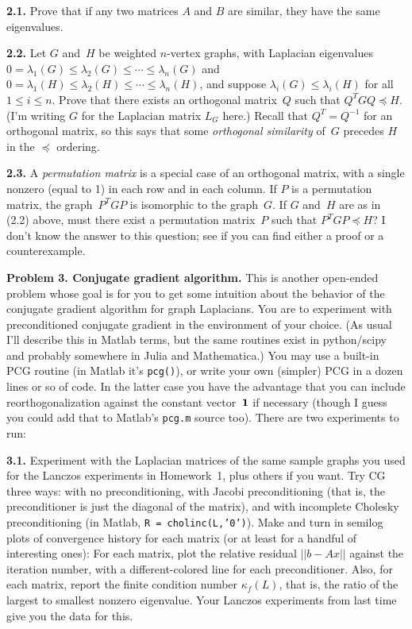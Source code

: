 \documentclass[11pt]{article}
\newcommand{\m}[1]{{\bf{#1}}}       %
\newcommand{\ones}{\m1}             %
\begin{document}
\par\medskip
{\bf 2.1.} 
Prove that if any two matrices $A$ and $B$ are similar, 
they have the same eigenvalues.

\par\medskip
{\bf 2.2.} 
Let $G$ and~$H$ be weighted $n$-vertex graphs, 
with Laplacian eigenvalues
$0=\lambda_1(G)\le\lambda_2(G)\le\cdots\le\lambda_n(G)$ and
$0=\lambda_1(H)\le\lambda_2(H)\le\cdots\le\lambda_n(H)$,
and suppose $\lambda_i(G)\le\lambda_i(H)$ for all $1\le i\le n$.
Prove that there exists an orthogonal matrix~$Q$ such that
$Q^TGQ \preceq H$. 
(I'm writing $G$ for the Laplacian matrix $L_G$ here.)
Recall that $Q^T=Q^{-1}$ for an orthogonal matrix,
so this says that some {\em orthogonal similarity} of~$G$
precedes $H$ in the $\preceq$ ordering.

\par\medskip
{\bf 2.3.} 
A {\em permutation matrix} is a special case of an orthogonal matrix, 
with a single nonzero (equal to 1) in each row and in each column.
If $P$ is a permutation matrix, 
the graph~$P^TGP$ is isomorphic to the graph~$G$.
If $G$ and~$H$ are as in (2.2) above, 
must there exist a permutation matrix~$P$ such that $P^TGP \preceq H$?
I don't know the answer to this question; 
see if you can find either a proof or a counterexample.

\par\bigskip
{\bf Problem 3. Conjugate gradient algorithm.}
This is another open-ended problem whose goal is for you to get some
intuition about the behavior of the conjugate gradient algorithm for graph 
Laplacians.
You are to experiment with preconditioned conjugate gradient
in the environment of your choice.
(As usual I'll describe this in Matlab terms, but the same routines
exist in python/scipy and probably somewhere in Julia and Mathematica.)
You may use a built-in PCG routine (in Matlab it's {\tt pcg()}),
or write your own (simpler) PCG in a dozen lines or so of code.
In the latter case you have the advantage that you can include reorthogonalization
against the constant vector~$\ones$ if necessary 
(though I guess you could add that to Matlab's {\tt pcg.m} source too).
There are two experiments to run:

\par\medskip
{\bf 3.1.}
Experiment with the Laplacian matrices of the same sample graphs you
used for the Lanczos experiments in Homework~1, plus others if you want.
Try CG three ways:  with no preconditioning, with Jacobi preconditioning
(that is, the preconditioner is just the diagonal of the matrix), and
with incomplete Cholesky preconditioning 
(in Matlab, {\tt R = cholinc(L,'0')}).
Make and turn in semilog plots of convergence history for each matrix
(or at least for a handful of interesting ones):
For each matrix, plot the relative residual $||b-Ax||$ against the 
iteration number, with a different-colored line for each preconditioner.
Also, for each matrix, report the finite condition number $\kappa_f(L)$, 
that is, the ratio of the largest to smallest nonzero eigenvalue.  
Your Lanczos experiments from last time give you the data for this.
\end{document}

